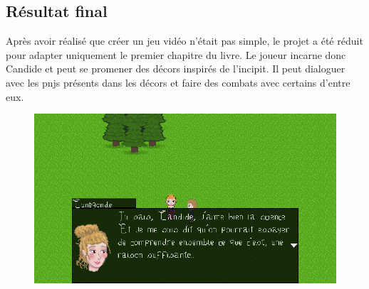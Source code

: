 \documentclass[11pt]{article}
\begin{document}
\subsection{Résultat final}
Après avoir réalisé que créer un jeu vidéo n'était pas simple, le projet a été réduit pour adapter uniquement le premier chapitre du livre. 
Le joueur incarne donc Candide et peut se promener des décors inspirés de l'incipit. Il peut dialoguer avec les pnjs présents dans les décors et faire des combats avec certains d'entre eux.
\begin{figure}[H]
\includegraphics[scale=0.33]{cunegondeScn}
\centering
\end{figure}
\end{document}
